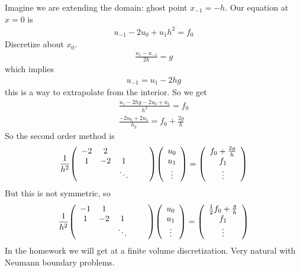 \documentclass{article}
\begin{document}
            Imagine we are extending the domain: ghost point $x_{-1} = -h$.  Our equation at $x = 0$ is
            \begin{align}
                {u_{-1} - 2u_0 + u_1}{h^2} = f_0
            \end{align}
            Discretize about $x_0$.
            \begin{align}
                \frac{u_1 - u_{-1}}{2h} = g
            \end{align}
            which implies
            \begin{align}
                u_{-1} = u_1 - 2hg
            \end{align}
            this is a way to extrapolate from the interior.  So we get
            \begin{align}
                \frac{u_1 - 2hg - 2u_0 + u_1}{h^2} = f_0 \\
                \frac{-2u_0 + 2u_1}{h_2} = f_0 + \frac{2g}{h}
            \end{align}
            So the second order method is
            \begin{align}
                \frac{1}{h^2}\qty(\begin{array}{ccccc}
                    -2 & 2 & & & \\
                    1 & -2 & 1 & & \\
                    & & \ddots & &
                \end{array})\qty(\begin{array}{c}
                    u_0 \\ u_1 \\ \vdots
                \end{array}) = \qty(\begin{array}{c}
                    f_0 + \frac{2g}{h} \\ f_1 \\ \vdots
                \end{array})
            \end{align}
            But this is not symmetric, so
            \begin{align}
                \frac{1}{h^2}\qty(\begin{array}{ccccc}
                    -1 & 1 & & & \\
                    1 & -2 & 1 & & \\
                    & & \ddots & &
                \end{array})\qty(\begin{array}{c}
                    u_0 \\ u_1 \\ \vdots
                \end{array}) = \qty(\begin{array}{c}
                    \frac{1}{2}f_0 + \frac{g}{h} \\ f_1 \\ \vdots
                \end{array})
            \end{align}
            In the homework we will get at a finite volume discretization.  Very natural with Neumann boundary problems.
\end{document}
